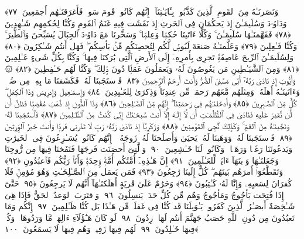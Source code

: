  وَنَصَرنَـٰهُ مِنَ ٱلقَومِ ٱلَّذِينَ كَذَّبُوا۟ بِـَٔايَـٰتِنَآ ۚ إِنَّهُم كَانُوا۟ قَومَ سَوءٍۢ فَأَغرَقنَـٰهُم أَجمَعِينَ ﴿٧٧﴾
 وَدَاوُۥدَ وَسُلَيمَـٰنَ إِذ يَحكُمَانِ فِى ٱلحَرثِ إِذ نَفَشَت فِيهِ غَنَمُ ٱلقَومِ وَكُنَّا لِحُكمِهِم شَـٰهِدِينَ ﴿٧٨﴾
 فَفَهَّمنَـٰهَا سُلَيمَـٰنَ ۚ وَكُلًّا ءَاتَينَا حُكمًۭا وَعِلمًۭا ۚ وَسَخَّرنَا مَعَ دَاوُۥدَ ٱلجِبَالَ يُسَبِّحنَ وَٱلطَّيرَ ۚ وَكُنَّا فَـٰعِلِينَ ﴿٧٩﴾
 وَعَلَّمنَـٰهُ صَنعَةَ لَبُوسٍۢ لَّكُم لِتُحصِنَكُم مِّنۢ بَأسِكُم ۖ فَهَل أَنتُم شَـٰكِرُونَ ﴿٨٠﴾
 وَلِسُلَيمَـٰنَ ٱلرِّيحَ عَاصِفَةًۭ تَجرِى بِأَمرِهِۦٓ إِلَى ٱلأَرضِ ٱلَّتِى بَٰرَكنَا فِيهَا ۚ وَكُنَّا بِكُلِّ شَىءٍ عَـٰلِمِينَ ﴿٨١﴾
 وَمِنَ ٱلشَّيَـٰطِينِ مَن يَغُوصُونَ لَهُۥ وَيَعمَلُونَ عَمَلًۭا دُونَ ذَٟلِكَ ۖ وَكُنَّا لَهُم حَـٰفِظِينَ ﴿٨٢﴾
 ۞ وَأَيُّوبَ إِذ نَادَىٰ رَبَّهُۥٓ أَنِّى مَسَّنِىَ ٱلضُّرُّ وَأَنتَ أَرحَمُ ٱلرَّٟحِمِينَ ﴿٨٣﴾
 فَٱستَجَبنَا لَهُۥ فَكَشَفنَا مَا بِهِۦ مِن ضُرٍّۢ ۖ وَءَاتَينَـٰهُ أَهلَهُۥ وَمِثلَهُم مَّعَهُم رَحمَةًۭ مِّن عِندِنَا وَذِكرَىٰ لِلعَـٰبِدِينَ ﴿٨٤﴾
 وَإِسمَـٰعِيلَ وَإِدرِيسَ وَذَا ٱلكِفلِ ۖ كُلٌّۭ مِّنَ ٱلصَّـٰبِرِينَ ﴿٨٥﴾
 وَأَدخَلنَـٰهُم فِى رَحمَتِنَآ ۖ إِنَّهُم مِّنَ ٱلصَّـٰلِحِينَ ﴿٨٦﴾
 وَذَا ٱلنُّونِ إِذ ذَّهَبَ مُغَٰضِبًۭا فَظَنَّ أَن لَّن نَّقدِرَ عَلَيهِ فَنَادَىٰ فِى ٱلظُّلُمَـٰتِ أَن لَّآ إِلَـٰهَ إِلَّآ أَنتَ سُبحَـٰنَكَ إِنِّى كُنتُ مِنَ ٱلظَّـٰلِمِينَ ﴿٨٧﴾
 فَٱستَجَبنَا لَهُۥ وَنَجَّينَـٰهُ مِنَ ٱلغَمِّ ۚ وَكَذَٟلِكَ نُۨجِى ٱلمُؤمِنِينَ ﴿٨٨﴾
 وَزَكَرِيَّآ إِذ نَادَىٰ رَبَّهُۥ رَبِّ لَا تَذَرنِى فَردًۭا وَأَنتَ خَيرُ ٱلوَٟرِثِينَ ﴿٨٩﴾
 فَٱستَجَبنَا لَهُۥ وَوَهَبنَا لَهُۥ يَحيَىٰ وَأَصلَحنَا لَهُۥ زَوجَهُۥٓ ۚ إِنَّهُم كَانُوا۟ يُسَـٰرِعُونَ فِى ٱلخَيرَٰتِ وَيَدعُونَنَا رَغَبًۭا وَرَهَبًۭا ۖ وَكَانُوا۟ لَنَا خَـٰشِعِينَ ﴿٩٠﴾
 وَٱلَّتِىٓ أَحصَنَت فَرجَهَا فَنَفَخنَا فِيهَا مِن رُّوحِنَا وَجَعَلنَـٰهَا وَٱبنَهَآ ءَايَةًۭ لِّلعَـٰلَمِينَ ﴿٩١﴾
 إِنَّ هَـٰذِهِۦٓ أُمَّتُكُم أُمَّةًۭ وَٟحِدَةًۭ وَأَنَا۠ رَبُّكُم فَٱعبُدُونِ ﴿٩٢﴾
 وَتَقَطَّعُوٓا۟ أَمرَهُم بَينَهُم ۖ كُلٌّ إِلَينَا رَٰجِعُونَ ﴿٩٣﴾
 فَمَن يَعمَل مِنَ ٱلصَّـٰلِحَـٰتِ وَهُوَ مُؤمِنٌۭ فَلَا كُفرَانَ لِسَعيِهِۦ وَإِنَّا لَهُۥ كَـٰتِبُونَ ﴿٩٤﴾
 وَحَرَٰمٌ عَلَىٰ قَريَةٍ أَهلَكنَـٰهَآ أَنَّهُم لَا يَرجِعُونَ ﴿٩٥﴾
 حَتَّىٰٓ إِذَا فُتِحَت يَأجُوجُ وَمَأجُوجُ وَهُم مِّن كُلِّ حَدَبٍۢ يَنسِلُونَ ﴿٩٦﴾
 وَٱقتَرَبَ ٱلوَعدُ ٱلحَقُّ فَإِذَا هِىَ شَـٰخِصَةٌ أَبصَـٰرُ ٱلَّذِينَ كَفَرُوا۟ يَـٰوَيلَنَا قَد كُنَّا فِى غَفلَةٍۢ مِّن هَـٰذَا بَل كُنَّا ظَـٰلِمِينَ ﴿٩٧﴾
 إِنَّكُم وَمَا تَعبُدُونَ مِن دُونِ ٱللَّهِ حَصَبُ جَهَنَّمَ أَنتُم لَهَا وَٟرِدُونَ ﴿٩٨﴾
 لَو كَانَ هَـٰٓؤُلَآءِ ءَالِهَةًۭ مَّا وَرَدُوهَا ۖ وَكُلٌّۭ فِيهَا خَـٰلِدُونَ ﴿٩٩﴾
 لَهُم فِيهَا زَفِيرٌۭ وَهُم فِيهَا لَا يَسمَعُونَ ﴿١٠٠﴾
